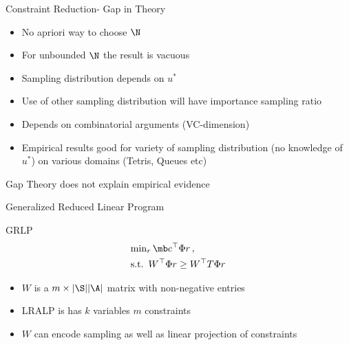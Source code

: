 \documentclass[10pt]{beamer}
\begin{document}
\begin{frame}[fragile]{Constraint Reduction- Gap in Theory}
\begin{block}{\cite{de2004constraint}}
\begin{itemize}
\item No apriori way to choose $\N$
\item For unbounded $\N$ the result is vacuous
\item Sampling distribution depends on $u^*$
\item Use of other sampling distribution will have importance sampling ratio
\item Depends on combinatorial arguments (VC-dimension)
\item \cite{farias2006tetris,de2003linear,de2004constraint} Empirical results good for variety of sampling distribution (no knowledge of $u^*$) on various domains (Tetris, Queues etc)
\end{itemize}
\end{block}
\begin{block}{Gap}
Theory does not explain empirical evidence
\end{block}
\end{frame}

\begin{frame}[fragile]{Generalized Reduced Linear Program}
\begin{block}{GRLP}
\begin{align*}
&{\min}_r \,\mb c^\top \Phi r\,,\\
&\text{s.t.} \,\,\, W^\top  \Phi r\geq W^\top T \Phi r\,\\
\end{align*}
\end{block}

\begin{itemize}
\item $W$ is a $m\times |\S||\A|$ matrix with non-negative entries
\item LRALP is has $k$ variables $m$ constraints
\item $W$ can encode sampling as well as linear projection of constraints
\end{itemize}
\end{frame}
\end{document}
